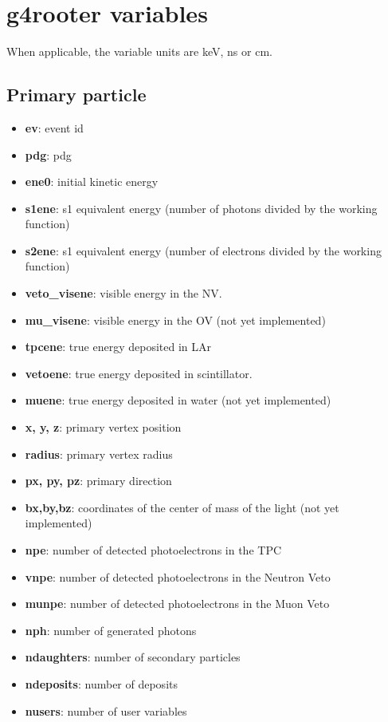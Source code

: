 \documentclass[twocolumn, 10pt]{article}
\begin{document}
\section{g4rooter variables}

When applicable, the variable units are keV, ns or cm.

\subsection{Primary particle}
\begin{itemize}
\item {\bf{ev}}:   event id
\item {\bf{pdg}}:    pdg
\item {\bf{ene0}}:  initial kinetic energy
\item {\bf{s1ene}}: s1 equivalent energy (number of photons divided by the working function)
\item {\bf{s2ene}}: s1 equivalent energy (number of electrons divided by the working function)
\item {\bf{veto\_visene}}: visible energy in the NV. 
\item {\bf{mu\_visene}}: visible energy in the OV (not yet implemented)
\item {\bf{tpcene}}: true energy deposited in LAr
\item {\bf{vetoene}}: true energy deposited in scintillator. 
\item {\bf{muene}}: true energy deposited in water (not yet implemented)

\item {\bf{x, y, z}}: primary vertex position
\item {\bf{radius}}: primary vertex radius
\item {\bf{px, py, pz}}: primary direction
\item {\bf{bx,by,bz}}:  coordinates of the center of mass of the light (not yet implemented) 
\item {\bf{npe}}:  number of detected photoelectrons in the TPC
\item {\bf{vnpe}}: number of detected photoelectrons in the Neutron Veto
\item {\bf{munpe}}: number of detected photoelectrons in the Muon Veto
\item {\bf{nph}}: number of generated photons
\item {\bf{ndaughters}}: number of secondary particles
\item {\bf{ndeposits}}: number of deposits
\item {\bf{nusers}}:   number of user variables
\end{itemize}
\end{document}
